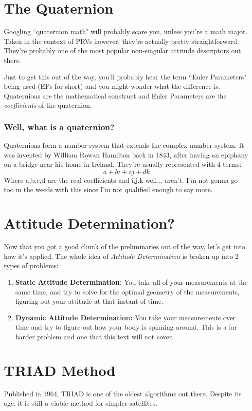 \documentclass[a4paper,14pt]{extreport}
\begin{document}
\chapter{The Quaternion}
Googling ``quaternion math" will probably scare you, unless you're a math major. Taken in the context of PRVs however, they're actually pretty straightforward. They're probably one of the most popular non-singular attitude descriptors out there. 

Just to get this out of the way, you'll probably hear the term ``Euler Parameters" being used (EPs for short) and you might wonder what the difference is. Quaternions are the mathematical construct and Euler Parameters are the \emph{coefficients} of the quaternion. 
 
\subsection{Well, what is a quaternion?}
Quaternions form a number system that extends the complex number system. It was invented by William Rowan Hamilton back in 1843, after having an epiphany on a bridge near his home in Ireland. They're usually represented with 4 terms:
\[
a + bi + cj + dk
\]
Where a,b,c,d are the real coefficients and i,j,k well... aren't. I'm not gonna go too in the weeds with this since I'm not qualified enough to say more.

\chapter{Attitude Determination?}
Now that you got a good chunk of the preliminaries out of the way, let's get into how it's applied. The whole idea of \emph{Attitude Determination} is broken up into 2 types of problems:
\begin{enumerate}
\item{
\textbf{Static Attitude Determination:} You take all of your measurements at the same time, and try to solve for the optimal geometry of the measurements, figuring out your attitude at that instant of time.
}
\item{\textbf{Dynamic Attitude Determination:} You take your measurements over time and try to figure out how your body is spinning around. This is a far harder problem and one that this text will not cover.
}
\end{enumerate}


\chapter{TRIAD Method}
Published in 1964, TRIAD is one of the oldest algorithms out there. Despite its age, it is still a viable method for simpler satellites.
\end{document}
